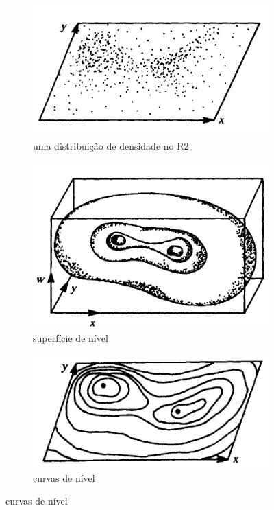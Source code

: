 \begin{figure}[!ht]
\begin{subfigure}[t]{0.32\linewidth}
\includegraphics[scale=0.3]{figs/leah/fig09.01c.png}
\caption{\small uma distribuição de densidade no R2}
\label{fig:09.01c}
\end{subfigure}
\vfil
\begin{subfigure}[t]{0.5\linewidth}\centering
\includegraphics[scale=0.3]{figs/leah/fig09.01d.png}
\caption{\small superfície de nível}
\label{fig:09.01d}
\end{subfigure}
\begin{subfigure}[t]{0.5\linewidth}\centering
\includegraphics[scale=0.3]{figs/leah/fig09.01e.png}
\caption{\small curvas de nível}
\label{fig:09.01e}
\end{subfigure}
\end{figure}




